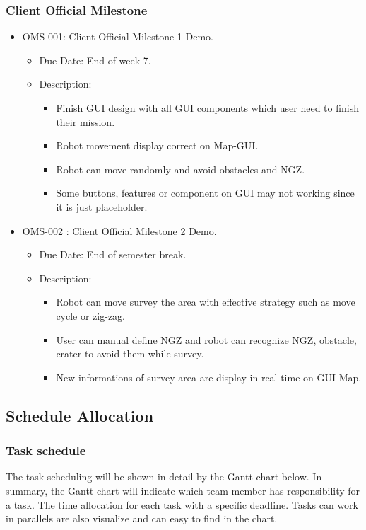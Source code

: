 	\subsubsection{Client Official Milestone}
		\begin{itemize}
			\item OMS-001: Client Official Milestone 1 Demo.
			\begin{itemize}
				\item Due Date: End of week 7.
				\item Description:
				\begin{itemize}
					\item Finish GUI design with all GUI components which user need to finish their mission.
					\item Robot movement display correct on Map-GUI.
					\item Robot can move randomly and avoid obstacles and NGZ.
					\item Some buttons, features or component on GUI may not working since it is just placeholder. 
				\end{itemize}
			\end{itemize}
			\item OMS-002 : Client Official Milestone 2 Demo.
			\begin{itemize}
				\item Due Date: End of semester break.
				\item Description:
				\begin{itemize}
					\item Robot can move survey the area with effective strategy such as move cycle or zig-zag.
					\item User can manual define NGZ and robot can recognize NGZ, obstacle, crater to avoid them while survey.
					\item New informations of survey area are display in real-time on GUI-Map.
				\end{itemize}
			\end{itemize}
		\end{itemize}
\subsection{Schedule Allocation}
\subsubsection{Task schedule}
The task scheduling will be shown in detail by the Gantt chart below. In summary, the Gantt chart will indicate which team member has responsibility for a task. The time allocation for each task with a specific  deadline. Tasks can work in parallels are also visualize and can easy to find in the chart.     
